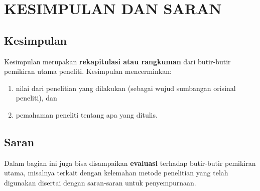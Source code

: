 \chapter{KESIMPULAN DAN SARAN} \label{kesimpulan-dan-saran}



\section{Kesimpulan}


Kesimpulan merupakan \textbf{rekapitulasi atau rangkuman} dari butir-butir pemikiran utama peneliti. Kesimpulan mencerminkan:
 \begin{enumerate}
 	\item nilai dari penelitian yang dilakukan (sebagai wujud sumbangan orisinal peneliti), dan
 	\item pemahaman peneliti tentang apa yang ditulis.
 \end{enumerate}
 


\section{Saran}

Dalam bagian ini juga bisa disampaikan \textbf{evaluasi} terhadap butir-butir pemikiran utama, misalnya terkait dengan kelemahan metode penelitian yang telah digunakan disertai dengan saran-saran untuk penyempurnaan.

